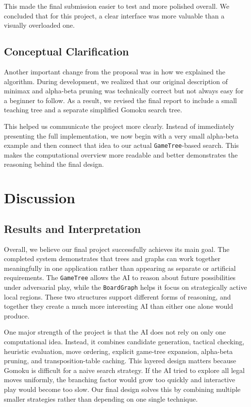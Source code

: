 \documentclass[11pt]{article}
\begin{document}
This made the final submission easier to test and more polished overall. We concluded that for this project, a clear interface was more valuable than a visually overloaded one.

\subsection*{Conceptual Clarification}

Another important change from the proposal was in how we explained the algorithm. During development, we realized that our original description of minimax and alpha-beta pruning was technically correct but not always easy for a beginner to follow. As a result, we revised the final report to include a small teaching tree and a separate simplified Gomoku search tree.

This helped us communicate the project more clearly. Instead of immediately presenting the full implementation, we now begin with a very small alpha-beta example and then connect that idea to our actual \texttt{GameTree}-based search. This makes the computational overview more readable and better demonstrates the reasoning behind the final design.

\section*{Discussion}

\subsection*{Results and Interpretation}

Overall, we believe our final project successfully achieves its main goal. The completed system demonstrates that trees and graphs can work together meaningfully in one application rather than appearing as separate or artificial requirements. The \texttt{GameTree} allows the AI to reason about future possibilities under adversarial play, while the \texttt{BoardGraph} helps it focus on strategically active local regions. These two structures support different forms of reasoning, and together they create a much more interesting AI than either one alone would produce.

One major strength of the project is that the AI does not rely on only one computational idea. Instead, it combines candidate generation, tactical checking, heuristic evaluation, move ordering, explicit game-tree expansion, alpha-beta pruning, and transposition-table caching. This layered design matters because Gomoku is difficult for a naive search strategy. If the AI tried to explore all legal moves uniformly, the branching factor would grow too quickly and interactive play would become too slow. Our final design solves this by combining multiple smaller strategies rather than depending on one single technique.
\end{document}
